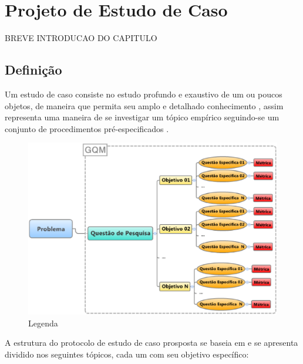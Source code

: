 \chapter{Projeto de Estudo de Caso}
\label{chap:proj-est-caso}


BREVE INTRODUCAO DO CAPITULO 

\section{Definição}\label{sec:Definição}

Um estudo de caso consiste no estudo profundo e exaustivo de um ou poucos objetos, de maneira que permita seu amplo e detalhado conhecimento \cite{gil-estudo}, assim representa uma maneira de se investigar um tópico empírico seguindo-se um conjunto de procedimentos pré-especificados \cite{yin2001estudo}.


\begin{figure}[h!]
\centering
\includegraphics[keepaspectratio=false,scale=0.53]{figuras/figuras_pedro/estrut-estudo-caso.eps}
\caption{ Legenda }
\label{fig:estrut-est-caso}
\end{figure}
\FloatBarrier


A estrutura do protocolo de estudo de caso prosposta se baseia em  e se apresenta dividido nos seguintes tópicos, cada um com seu objetivo específico:

